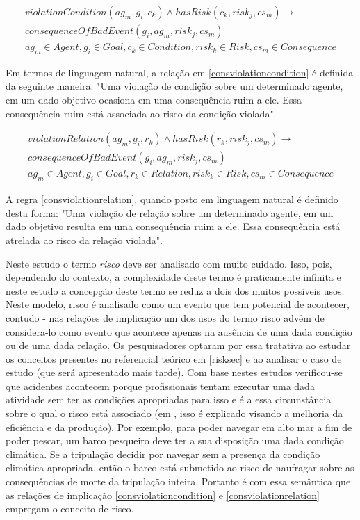 \begin{eqnarray}\label{consviolationcondition}\nonumber
	violationCondition(ag_m,g_i,c_k)  \wedge hasRisk(c_k,risk_j,cs_m) \to \nonumber \\ 
	consequenceOfBadEvent(g_i,ag_m,risk_j,cs_m) \nonumber \\ 
    ag_m \in Agent, g_i \in Goal, c_k \in Condition, risk_k \in Risk, cs_m \in Consequence
\end{eqnarray}

Em termos de linguagem natural, a relação em \ref{consviolationcondition} é definida da seguinte maneira: "Uma violação de condição sobre um determinado agente, em um dado objetivo ocasiona em uma consequência ruim a ele. Essa consequência ruim está associada ao risco da condição violada". 

\begin{eqnarray}\label{consviolationrelation}\nonumber
	violationRelation(ag_m,g_i,r_k) \wedge hasRisk(r_k,risk_j,cs_m) \to \\ 
	consequenceOfBadEvent(g_i,ag_m,risk_j,cs_m) \nonumber \\ 
    ag_m \in Agent, g_i \in Goal, r_k \in Relation, risk_k \in Risk, cs_m \in Consequence 
\end{eqnarray}

A regra \ref{consviolationrelation}, quando posto em linguagem natural é definido desta forma: "Uma violação de relação sobre um determinado agente, em um dado objetivo resulta em uma consequência ruim a ele. Essa consequência está atrelada ao risco da relação violada". 

Neste estudo o termo \textit{risco} deve ser analisado com muito cuidado. Isso, pois, dependendo do contexto, a complexidade deste termo é praticamente infinita e neste estudo a concepção deste termo se reduz a dois dos muitos possíveis usos. Neste modelo, risco é analisado como um evento que tem potencial de acontecer, contudo - nas relações de implicação um dos usos do termo risco advêm de considera-lo como evento que acontece apenas na ausência de uma dada condição ou de uma dada relação. Os pesquisadores optaram por essa tratativa ao estudar os conceitos presentes no referencial teórico em \ref{risksec} e ao analisar o caso de estudo (que será apresentado mais tarde). Com base nestes estudos verificou-se que acidentes acontecem porque profissionais tentam executar uma dada atividade sem ter as condições apropriadas 
para isso e é a essa circunstância sobre o qual o risco está associado (em \cite{safety}, isso é explicado visando a melhoria da eficiência e da produção). Por exemplo, para poder navegar em alto mar a fim de poder pescar, um barco pesqueiro deve ter a sua disposição uma dada condição climática. Se a tripulação decidir por navegar sem a presença da condição climática apropriada, então o barco está submetido ao risco de naufragar sobre as consequências de morte da tripulação inteira. Portanto é com essa semântica que as relações de implicação \ref{consviolationcondition} e \ref{consviolationrelation} empregam o conceito de risco. 


